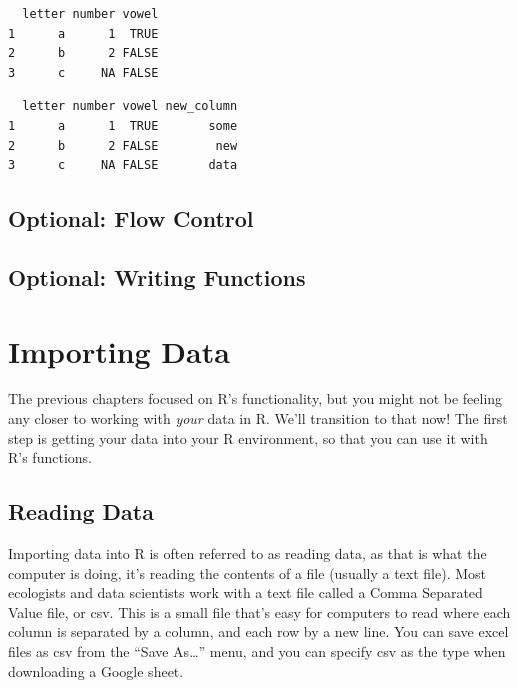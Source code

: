 \documentclass[
  letterpaper,
  DIV=11,
  numbers=noendperiod]{scrreprt}
\newenvironment{Shaded}{\begin{snugshade}}{\end{snugshade}}
\newcommand{\DocumentationTok}[1]{\textcolor[rgb]{0.37,0.37,0.37}{\textit{#1}}}
\newcommand{\FunctionTok}[1]{\textcolor[rgb]{0.28,0.35,0.67}{#1}}
\newcommand{\NormalTok}[1]{\textcolor[rgb]{0.00,0.23,0.31}{#1}}
\newcommand{\OtherTok}[1]{\textcolor[rgb]{0.00,0.23,0.31}{#1}}
\newcommand{\SpecialCharTok}[1]{\textcolor[rgb]{0.37,0.37,0.37}{#1}}
\newcommand{\StringTok}[1]{\textcolor[rgb]{0.13,0.47,0.30}{#1}}
\begin{document}
\begin{verbatim}
  letter number vowel
1      a      1  TRUE
2      b      2 FALSE
3      c     NA FALSE
\end{verbatim}

\begin{Shaded}
\end{Shaded}

\begin{verbatim}
  letter number vowel new_column
1      a      1  TRUE       some
2      b      2 FALSE        new
3      c     NA FALSE       data
\end{verbatim}

\section{Optional: Flow Control}\label{optional-flow-control}

\section{Optional: Writing Functions}\label{optional-writing-functions}

\chapter{Importing Data}\label{importing-data}

The previous chapters focused on R's functionality, but you might not be
feeling any closer to working with \emph{your} data in R. We'll
transition to that now! The first step is getting your data into your R
environment, so that you can use it with R's functions.

\section{Reading Data}\label{reading-data}

Importing data into R is often referred to as reading data, as that is
what the computer is doing, it's reading the contents of a file (usually
a text file). Most ecologists and data scientists work with a text file
called a Comma Separated Value file, or csv. This is a small file that's
easy for computers to read where each column is separated by a column,
and each row by a new line. You can save excel files as csv from the
``Save As\ldots{}'' menu, and you can specify csv as the type when
downloading a Google sheet.
\end{document}
